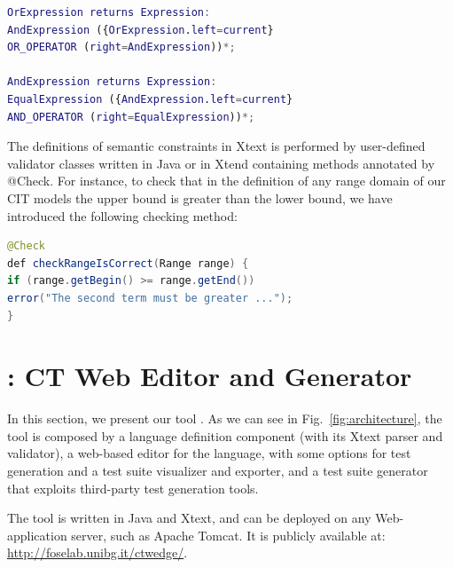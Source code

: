 \begin{tikzborder}{\cite{Gargantini16:validation}}
\begin{tikzborder}{\cite{gargantini_combinatorial_2017}}
\begin{tikzborder}{\cite{garn2019}}
\begin{tikzborder}{\cite{arcaini2019achieving}}
\begin{lstlisting}[language=Matlab,columns=fullflexible,basicstyle=\small\ttfamily,stringstyle=\ttfamily\color{blue},upquote=true,morekeywords={returns}]  
OrExpression returns Expression:
AndExpression ({OrExpression.left=current} 
OR_OPERATOR (right=AndExpression))*;

AndExpression returns Expression:
EqualExpression ({AndExpression.left=current}
AND_OPERATOR (right=EqualExpression))*;
\end{lstlisting}


\begin{tikzborder}{}
The definitions of semantic constraints in Xtext is performed by user-defined validator classes written in Java or in Xtend containing methods annotated by {\small\ttfamily @Check}. For instance, to check that in the definition of any range domain of our CIT models  the upper bound is greater than the lower bound, we have introduced the following checking method:
\end{tikzborder}

\begin{lstlisting}[language=Java,morekeywords={def},basicstyle=\small\ttfamily]
@Check
def checkRangeIsCorrect(Range range) {
if (range.getBegin() >= range.getEnd())
error("The second term must be greater ...");
}
\end{lstlisting}

\section{\ctwedge: CT Web Editor and Generator}\label{sec:ctwedge}

\begin{tikzborder}{}
In this section, we present our tool \ctwedge. 
As we can see in Fig.~\ref{fig:architecture}, the tool is composed by a language definition component (with its Xtext parser and validator), a web-based editor for the \ctwedge language, with some options for test generation and a test suite visualizer and exporter, and a test suite generator that exploits third-party test generation tools.

The tool is written in Java and Xtext, and can be deployed on any Web-application server, such as Apache Tomcat. It is publicly available at: \url{http://foselab.unibg.it/ctwedge/}.
\end{tikzborder}


\end{tikzborder}
\end{tikzborder}
\end{tikzborder}
\end{tikzborder}
